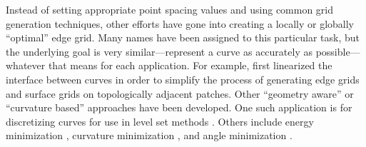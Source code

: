 Instead of setting appropriate point spacing values and using common grid generation techniques, other efforts have gone into creating a locally or globally ``optimal'' edge grid.  Many names have been assigned to this particular task, but the underlying goal is very similar—represent a curve as accurately as possible—whatever that means for each application.  For example, \cite{laug04} first linearized the interface between curves in order to simplify the process of generating edge grids and surface grids on topologically adjacent patches.  Other ``geometry aware'' or ``curvature based'' approaches have been developed.  One such application is for discretizing curves for use in level set methods \cite{macklin06}.  Others include energy minimization \cite{hofer04}, curvature minimization \cite{zehiry10}, and angle minimization \cite{ebeida10}.

